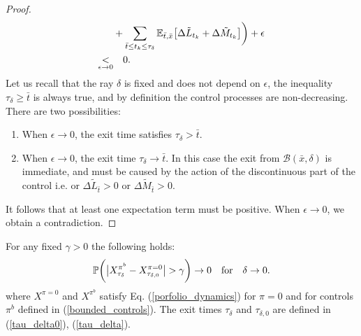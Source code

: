 \begin{proof}
\begin{align}
    & + \sum_{\bar t \leq t_k \leq \tau_{\delta}}  \mathbb{E}_{\bar t, \bar x} \bigl[ \Delta \tilde L_{t_k} + \Delta \tilde M_{t_k} \bigr]   \biggr) + \epsilon \\ \nonumber
    \underset{\epsilon \to 0}{<} & \quad 0.   
\end{align}
Let us recall that the ray $\delta$ is fixed and does not depend on $\epsilon$, the inequality $\tau_{\delta} \geq \bar t$ is always true, and 
by definition the control processes are non-decreasing.
There are two possibilities:
\begin{enumerate}
 \item When $\epsilon \to 0$, the exit time satisfies $\tau_{\delta} > \bar t$.  
 \item When $\epsilon \to 0$, the exit time $\tau_{\delta} \to \bar t$. In this case the exit from $\mathcal{B}(\bar x, \delta)$ is immediate, and must be caused by the action 
 of the discontinuous part of the control i.e. or $\Delta \tilde L_{\bar t} > 0$ or $\Delta \tilde M_{\bar t} > 0$.   
\end{enumerate}
It follows that at least one expectation term must be positive. When $\epsilon \to 0$, we obtain a contradiction.
\end{proof}


\begin{Lemma}\label{ball_theorem}
For any fixed $\gamma>0$ the following holds: 
$$ \mathbb{P} \biggl( \big| X^{\pi^b}_{\tau_{\delta}} - X^{\pi = 0}_{\tau_{\delta,0}} \big| > \gamma \biggr) \to 0 \quad \mbox{for} \quad \delta \to 0. $$ 
where $X^{\pi = 0}$ and $X^{\pi^b}$ satisfy Eq. (\ref{porfolio_dynamics}) for $\pi=0$ and for controls $\pi^b$ defined in (\ref{bounded_controls}). 
The exit times $\tau_{\delta}$ and $\tau_{\delta,0}$ are defined in (\ref{tau_delta0}), (\ref{tau_delta}).
\end{Lemma}

